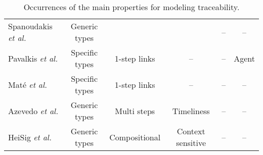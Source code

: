 \begin{table}[h]
\begin{tabular}{l|c|c|c|c|c}
Spanoudakis \textit{et al.}%
\cite{spanoudakis2004-rule-based-generation-of-req-traceability-relations}     &    
Generic types &                  &            & --  & -- \\

Pavalkis \textit{et al.}%
\cite{pavalkis2017-TIM-for-BPMN}     &  
Specific types & 1-step links & --  & --  & Agent \\

Maté \textit{et al.}%
\cite{mate2011-TIM-for-MDA-data-warehouses}     &  
Specific types & 1-step links & -- & --  & -- \\ \hline

Azevedo  \textit{et al.}%
\cite{azevedo2019-traceability-metamodel-and-reference-model}     &    
Generic types & Multi steps & Timeliness  & --  & --\\

HeiSig \textit{et al.}%
\cite{heisig2019-generic-traceability-metamodel-end-to-end-capra}     &    
Generic types & Compositional & Context sensitive & --  & -- 
\end{tabular}

\caption{Occurrences of the main properties for modeling traceability.}
\label{table:occurence-of-qualities}
\end{table}
